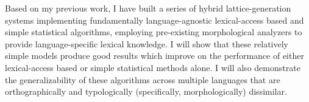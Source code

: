 Based on my previous work, I have built a series of hybrid lattice-generation systems implementing fundamentally language-agnostic lexical-access based and simple statistical algorithms, employing pre-existing morphological analyzers to provide language-specific lexical knowledge. I will show that these relatively simple models produce good results which improve on the performance of either lexical-access based or simple statistical methods alone. I will also demonstrate the generalizability of these algorithms across multiple languages that are orthographically and typologically (specifically, morphologically) dissimilar.